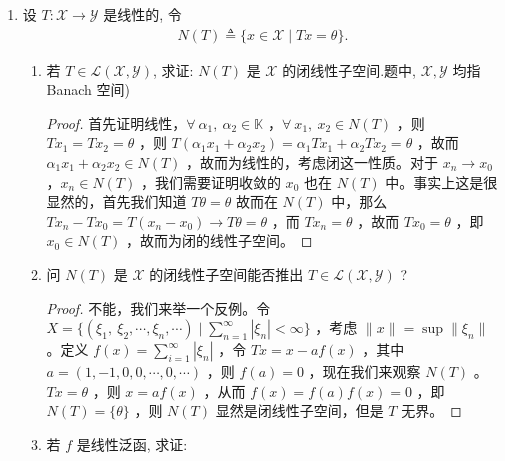 \begin{enumerate}[leftmargin=2cm, label=\arabic*]
		\begin{proof}
			由于 $\|f\| = \sup\limits_{\|x\| = 1}\frac{\|f(x)\|}{\|x\|}$ ，故而 $\forall\ \eta>0$  ，$\exists\ x_1$ ，使得 $\|f\| - \eta < \frac{\|f(x_1)\|}{\|x_1\|}$ 。故而我们有 $\frac{\|x_1\|}{\|f(x_1)\|}\|f\| < \frac{\|f\|}{\|f\| - \eta}$ ，取 $\eta = \frac{1}{1+\varepsilon}\|f\|$ 即得 $\frac{\|x_1\|}{\|f(x_1)\|} \|f\| < 1 + \varepsilon$ ，令 $x_0 = \frac{x_1}{f(x_1)}\|f\|$ ，则 $f(x_0) = \|f\|$ 且 $\|x_0\| = \frac{\|x_1\|}{\|f(x_1)\|}\|f\| < 1+ \varepsilon$ 。
		\end{proof}
		\item 设 $T: \mathscr{X} \rightarrow \mathscr{Y}$ 是线性的, 令
		\begin{align*}
			N(T) \triangleq\{x \in \mathscr{X} \mid T x=\theta\} .
		\end{align*}
		\begin{enumerate}[leftmargin=1cm, label=(\arabic*)]
			\item 若 $T \in \mathscr{L}(\mathscr{X}, \mathscr{Y})$, 求证: $N(T)$ 是 $\mathscr{X}$ 的闭线性子空间.题中, $\mathscr{X}, \mathscr{Y}$ 均指 Banach 空间)
			\begin{proof}
				首先证明线性，$\forall\ \alpha_1,\ \alpha_2\in \mathbb{K}$ ，$\forall\ x_1,\ x_2\in N(T)$ ，则 $Tx_1 = Tx_2 = \theta$ ，则 $T(\alpha_1x_1 + \alpha_2x_2) = \alpha_1Tx_1 + \alpha_2Tx_2 = \theta$ ，故而 $\alpha_1x_1 + \alpha_2x_2\in N(T)$ ，故而为线性的，考虑闭这一性质。对于 $x_n\to x_0$ ，$x_n\in N(T)$ ，我们需要证明收敛的 $x_0$ 也在 $N(T)$ 中。事实上这是很显然的，首先我们知道 $T\theta = \theta$ 故而在 $N(T)$ 中，那么 $Tx_n - Tx_0 = T(x_n-x_0)\to T\theta = \theta$ ，而 $Tx_n = \theta$ ，故而 $Tx_0 = \theta$ ，即 $x_0\in N(T)$ ，故而为闭的线性子空间。 
			\end{proof}
			\item 问 $N(T)$ 是 $\mathscr{X}$ 的闭线性子空间能否推出 $T \in \mathscr{L}(\mathscr{X}, \mathscr{Y})$ ?
			\begin{proof}
				不能，我们来举一个反例。令 $X = \{(\xi_1,\ \xi_2,\cdots, \xi_n, \cdots)\mid \sum\limits_{n=1}^{\infty} |\xi_n | < \infty\}$ ，考虑 $\|x\| = \sup\|\xi_n\|$ 。定义 $f(x) = \sum\limits_{i=1}^{\infty} |\xi_n|$ ，令 $Tx = x - a f(x)$ ，其中 $a = (1, -1, 0, 0, \cdots, 0, \cdots)$ ，则 $f(a) = 0$ ，现在我们来观察 $N(T)$ 。$Tx = \theta$ ，则 $x = af(x)$ ，从而 $f(x) = f(a)f(x) = 0$ ，即 $N(T) = \{\theta\}$ ，则 $N(T)$ 显然是闭线性子空间，但是 $T$ 无界。  
			\end{proof}
			\item 若 $f$ 是线性泛函, 求证:
			\begin{align*}

\end{align*}
\end{enumerate}
\end{enumerate}
